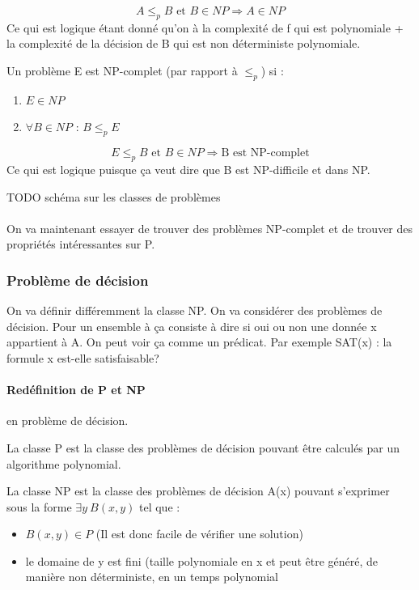 \begin{myprop}
	\[ A \leq_p B \text{ et } B\in NP \Rightarrow A\in NP \]
	Ce qui est logique étant donné qu'on à la complexité de f qui est
	polynomiale + la complexité de la décision de B qui est non déterministe
	polynomiale.
\end{myprop}


\begin{mydef}[NP-complétude]
	Un problème E est NP-complet (par rapport à $\leq_p$) si :
	\begin{enumerate}
		\item $E\in NP$
		\item $\forall B \in NP$ : $B\leq_p E$
	\end{enumerate}
\end{mydef}

\begin{myprop}
	\[ E \leq_p B \text{ et } B\in NP \Rightarrow \text{B est NP-complet} \]
	Ce qui est logique puisque ça veut dire que B est NP-difficile et dans
	NP.
\end{myprop}

TODO schéma sur les classes de problèmes

\paragraph{} On va maintenant essayer de trouver des problèmes NP-complet et de
trouver des propriétés intéressantes sur P.

\subsubsection{Problème de décision}
On va définir différemment la classe NP. On va considérer des problèmes de
décision. Pour un ensemble à ça consiste à dire si oui ou non une donnée x
appartient à A. On peut voir ça comme un prédicat. Par exemple SAT(x) : la
formule x est-elle satisfaisable?

\paragraph{Redéfinition de P et NP} en problème de décision.

\begin{mydef}[Classe P]
	La classe P est la classe des problèmes de décision pouvant être
	calculés par un algorithme polynomial.
\end{mydef}

\begin{mydef}[Classe NP]
	La classe NP est la classe des problèmes de décision A(x) pouvant
	s'exprimer sous la forme $\exists y \ B(x,y)$ tel que :
	\begin{itemize}
		\item $B(x,y) \in P$ (Il est donc facile de vérifier une
			solution)
		\item le domaine de y est fini (taille polynomiale en x
		       	et peut être généré, de manière non déterministe, en 
			un temps polynomial
	\end{itemize}
\end{mydef}

